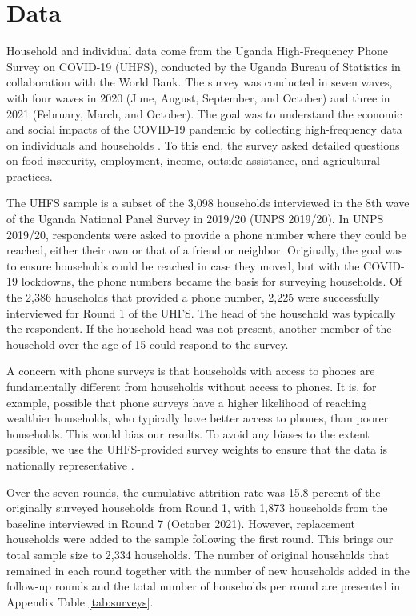 \documentclass{wber}
\begin{document}
\section{Data}\label{data}

Household and individual data come from the Uganda High-Frequency
Phone Survey on COVID-19 (UHFS), conducted by the Uganda Bureau of
Statistics in collaboration with the World Bank. The survey was
conducted in seven waves, with four waves in 2020 (June, August,
September, and October) and three in 2021 (February, March, and
October). The goal was to understand the economic and social impacts of
the COVID-19 pandemic by collecting high-frequency data on individuals
and households \citep{Uganda-Bureau-of-Statistics2022}. To this end, the
survey asked detailed questions on food insecurity, employment, income,
outside assistance, and agricultural practices.

The UHFS sample is a subset of the 3,098 households interviewed in the
8th wave of the Uganda National Panel Survey in 2019/20 (UNPS 2019/20).
In UNPS 2019/20, respondents were asked to provide a phone number where
they could be reached, either their own or that of a friend or neighbor.
Originally, the goal was to ensure households could be reached in case
they moved, but with the COVID-19 lockdowns, the phone numbers became
the basis for surveying households. Of the 2,386 households that
provided a phone number, 2,225 were successfully interviewed for Round 1
of the UHFS. The head of the household was typically the respondent. If
the household head was not present, another member of the household over
the age of 15 could respond to the survey.

A concern with phone surveys is that households with access to phones
are fundamentally different from households without access to phones. It
is, for example, possible that phone surveys have a higher likelihood of
reaching wealthier households, who typically have better access to
phones, than poorer households. This would bias our results. To avoid
any biases to the extent possible, we use the UHFS-provided survey
weights to ensure that the data is nationally representative
\citep{Uganda-Bureau-of-Statistics2022}.

Over the seven rounds, the cumulative attrition rate was 15.8 percent of
the originally surveyed households from Round 1, with 1,873 households
from the baseline interviewed in Round 7 (October 2021). However,
replacement households were added to the sample following the first
round. This brings our total sample size to 2,334 households. The number
of original households that remained in each round together with the
number of new households added in the follow-up rounds and the total
number of households per round are presented in Appendix Table
\ref{tab:surveys}.
\end{document}
